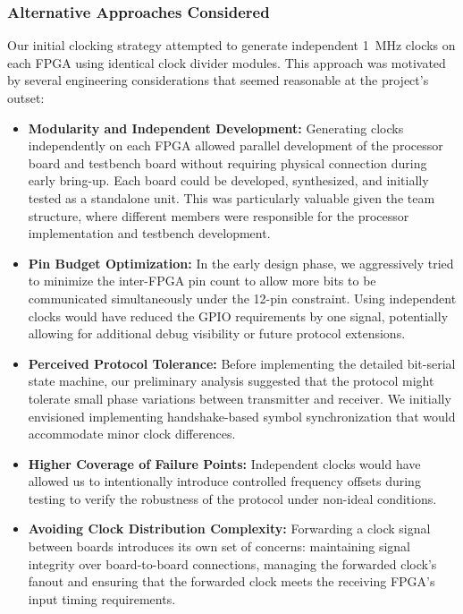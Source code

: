 \documentclass[12pt]{article}
\begin{document}
\subsubsection{Alternative Approaches Considered}
Our initial clocking strategy attempted to generate independent 1~MHz clocks on each FPGA using identical clock divider modules. This approach was motivated by several engineering considerations that seemed reasonable at the project's outset:

\begin{itemize}
    \item \textbf{Modularity and Independent Development:} Generating clocks independently on each FPGA allowed parallel development of the processor board and testbench board without requiring physical connection during early bring-up. Each board could be developed, synthesized, and initially tested as a standalone unit. This was particularly valuable given the team structure, where different members were responsible for the processor implementation and testbench development.
    
    \item \textbf{Pin Budget Optimization:} In the early design phase, we aggressively tried to minimize the inter-FPGA pin count to allow more bits to be communicated simultaneously under the 12-pin constraint. Using independent clocks would have reduced the GPIO requirements by one signal, potentially allowing for additional debug visibility or future protocol extensions.
    
    \item \textbf{Perceived Protocol Tolerance:} Before implementing the detailed bit-serial state machine, our preliminary analysis suggested that the protocol might tolerate small phase variations between transmitter and receiver. We initially envisioned implementing handshake-based symbol synchronization that would accommodate minor clock differences.
    
    \item \textbf{Higher Coverage of Failure Points:} Independent clocks would have allowed us to intentionally introduce controlled frequency offsets during testing to verify the robustness of the protocol under non-ideal conditions.
    
    \item \textbf{Avoiding Clock Distribution Complexity:} Forwarding a clock signal between boards introduces its own set of concerns: maintaining signal integrity over board-to-board connections, managing the forwarded clock's fanout and ensuring that the forwarded clock meets the receiving FPGA's input timing requirements.
\end{itemize}
\end{document}
